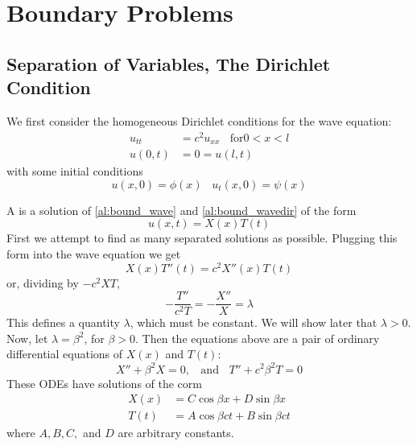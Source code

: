 %
%
%
\chapter{Boundary Problems}
\label{BoundProbs} %

\section{Separation of Variables, The Dirichlet Condition}

We first consider the homogeneous Dirichlet conditions for the wave equation: \begin{align}
    u_{tt} &= c^2u_{xx}\;\;\text{ for} 0 < x < l \label{al:bound_wave} \\
    u(0,t) &= 0 = u(l,t) \label{al:bound_wavedir}
\end{align}
with some initial conditions \begin{equation} \label{eq:bound_wave_initial}
    u(x,0) = \phi(x)\;\;\;u_t(x,0) = \psi(x)
\end{equation}

A  is a solution of \ref{al:bound_wave} and \ref{al:bound_wavedir} of the form \begin{equation*}
    u(x,t) = X(x)T(t)
\end{equation*}
First we attempt to find as many separated solutions as possible. Plugging this form into the wave equation we get \begin{equation*}
    X(x)T''(t) = c^2X''(x)T(t)
\end{equation*}
or, dividing by $-c^2XT$, \begin{equation*}
    -\frac{T''}{c^2T} = -\frac{X''}{X} = \lambda
\end{equation*}
This defines a quantity $\lambda$, which must be constant. We will show later that $\lambda > 0$. Now, let $\lambda = \beta^2$, for $\beta > 0$. Then the equations above are a pair of  ordinary differential equations of $X(x)$ and $T(t)$: \begin{equation*}
    X''+\beta^2X = 0,\;\;\text{ and }\;\;T'' + c^2\beta^2T = 0
\end{equation*}
These ODEs have solutions of the corm \begin{align}
    X(x) &= C\cos\beta x + D\sin \beta x \\
    T(t) &= A\cos \beta ct+B\sin\beta ct
\end{align}
where $A,B,C,$ and $D$ are arbitrary constants.

